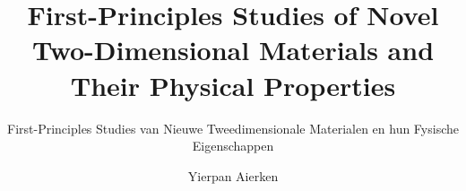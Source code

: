 \title{First-Principles Studies of Novel Two-Dimensional Materials and Their Physical Properties}

\subtitle{First-Principles Studies van Nieuwe Tweedimensionale Materialen en hun Fysische Eigenschappen}

\renewcommand{\submissiontext}{Proefschrift voorgelegd tot het behalen van de graad van doctor in de
wetenschappen aan de Universiteit Antwerpen te verdedigen door}

\author{Yierpan Aierken}








     

